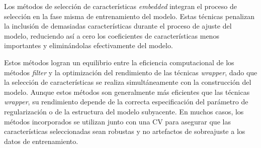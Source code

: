 Los métodos de selección de características \textit{embedded} integran el proceso de selección en la fase misma de entrenamiento del modelo. Estas técnicas penalizan la inclusión de demasiadas características durante el proceso de ajuste del modelo, reduciendo así a cero los coeficientes de características menos importantes y eliminándolas efectivamente del modelo.

Estos métodos logran un equilibrio entre la eficiencia computacional de los métodos \textit{filter} y la optimización del rendimiento de las técnicas \textit{wrapper}, dado que la selección de características se realiza simultáneamente con la construcción del modelo. Aunque estos métodos son generalmente más eficientes que las técnicas \textit{wrapper}, su rendimiento depende de la correcta especificación del parámetro de regularización o de la estructura del modelo subyacente. En muchos casos, los métodos incorporados se utilizan junto con una CV para asegurar que las características seleccionadas sean robustas y no artefactos de sobreajuste a los datos de entrenamiento. 